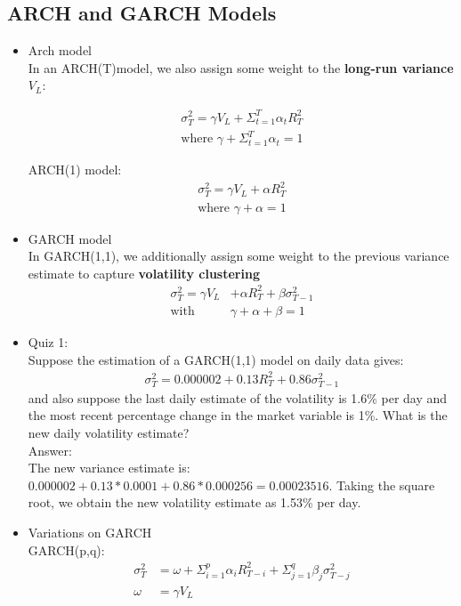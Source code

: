 \documentclass{maths}
\begin{document}
\subsection{ARCH and GARCH Models}
\begin{itemize}
\item Arch model\\
In an ARCH(T)model, we also assign some weight to the \textbf{long-run variance $V_L$}:

\begin{align*}
\sigma_T^2 = \gamma V_L+\Sigma_{t=1}^T\alpha_t R_T^2\\
\text{where } \gamma + \Sigma_{t=1}^T \alpha_t = 1
\end{align*}

ARCH(1) model:\\
\begin{align*}
\sigma_T^2 = \gamma V_L+\alpha R_T^2\\
\text{where } \gamma + \alpha = 1
\end{align*}

\item GARCH model\\
In GARCH(1,1), we additionally assign some weight to the previous variance estimate to capture \textbf{volatility clustering}
\begin{align*}
\sigma_T^2 = \gamma V_L &+ \alpha R_T^2 + \beta \sigma_{T-1}^2\\
\text{with }&\gamma +\alpha +\beta =1
\end{align*}

\item Quiz 1:\\
Suppose the estimation of a GARCH(1,1) model on daily data gives:
\begin{align*}
\sigma_T^2 = 0.000002 +0.13R_T^2 +0.86\sigma_{T-1}^2
\end{align*}
and also suppose the last daily estimate of the volatility is 1.6\% per day and the most recent percentage change in the market variable is 1\%. What is the new daily volatility estimate?\\

Answer:\\
The new variance estimate is: $0.000002 + 0.13*0.0001+0.86*0.000256 = 0.00023516$. Taking the square root, we obtain the new volatility estimate as 1.53\% per day.\\

\item Variations on GARCH\\
GARCH(p,q):\\
\begin{align*}
\sigma_T^2 &= \omega+\Sigma_{i=1}^p \alpha_i R_{T-i}^2 + \Sigma_{j=1}^q \beta_j \sigma_{T-j}^2\\
\omega&=\gamma V_L\\
\end{align*}


\end{itemize}
\end{document}
